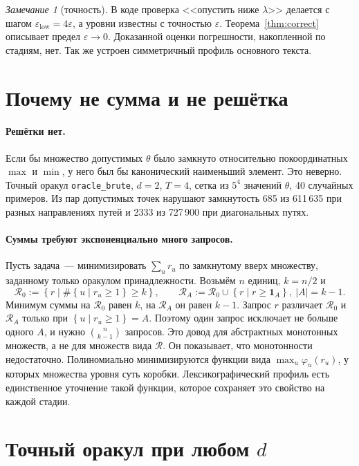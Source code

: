 \documentclass[a4paper,11pt]{article}
\theoremstyle{plain}
\theoremstyle{definition}
\theoremstyle{remark}
\newtheorem*{remark}{Замечание}
\newcommand{\abs}[1]{\left\lvert #1 \right\rvert}
\newcommand{\set}[1]{\left\{ #1 \right\}}
\begin{document}
\begin{remark}[точность]
    В коде проверка <<опустить ниже $\lambda$>> делается с шагом $\varepsilon_{\mathrm{low}}=4\varepsilon$, а уровни известны с точностью $\varepsilon$. Теорема~\ref{thm:correct} описывает предел $\varepsilon\to0$. Доказанной оценки погрешности, накопленной по стадиям, нет. Так же устроен симметричный профиль основного текста.
\end{remark}

\section{Почему не сумма и не решётка}

\paragraph{Решётки нет.} Если бы множество допустимых $\theta$ было замкнуто относительно покоординатных $\max$ и $\min$, у него был бы канонический наименьший элемент. Это неверно. Точный оракул \texttt{oracle\_brute}, $d=2$, $T=4$, сетка из $5^4$ значений $\theta$, 40 случайных примеров. Из пар допустимых точек нарушают замкнутость 685 из 611\,635 при разных направлениях путей и 2333 из 727\,900 при диагональных путях.

\paragraph{Суммы требуют экспоненциально много запросов.} Пусть задача~--- минимизировать $\sum_ur_u$ по замкнутому вверх множеству, заданному только оракулом принадлежности. Возьмём $n$ единиц, $k=n/2$ и
\[
    \mathcal R_0:=\set{r\mid\#\set{u\mid r_u\ge1}\ge k},\qquad\mathcal R_A:=\mathcal R_0\cup\set{r\mid r\ge\mathbf 1_A},\ \abs A=k-1.
\]
Минимум суммы на $\mathcal R_0$ равен $k$, на $\mathcal R_A$ он равен $k-1$. Запрос $r$ различает $\mathcal R_0$ и $\mathcal R_A$ только при $\set{u\mid r_u\ge1}=A$. Поэтому один запрос исключает не больше одного $A$, и нужно $\binom n{k-1}$ запросов. Это довод для абстрактных монотонных множеств, а не для множеств вида $\mathcal R$. Он показывает, что монотонности недостаточно. Полиномиально минимизируются функции вида $\max_u\varphi_u(r_u)$, у которых множества уровня суть коробки. Лексикографический профиль есть единственное уточнение такой функции, которое сохраняет это свойство на каждой стадии.

\section{Точный оракул при любом $d$}
\end{document}
